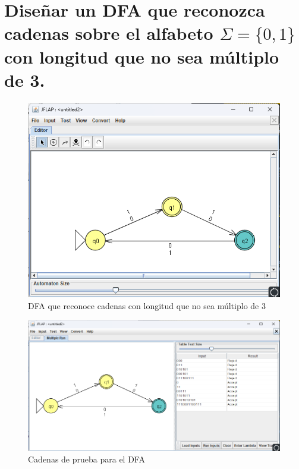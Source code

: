 \documentclass[11pt]{report}
\begin{document}
\section{Diseñar un DFA que reconozca cadenas sobre el alfabeto $\Sigma = \{0, 1\}$ con longitud que no sea múltiplo de 3.}
\begin{figure}[H]
  \centering
  \includegraphics[scale=0.6]{img/DFA_09.png}
  \caption{DFA que reconoce cadenas con longitud que no sea múltiplo de 3}
\end{figure}

\begin{figure}[H]
  \centering
  \includegraphics[scale=0.65]{img/DFA_09_test.png}
  \caption{Cadenas de prueba para el DFA}
\end{figure}

\newpage
\end{document}
